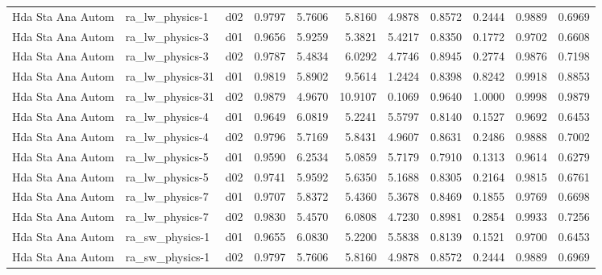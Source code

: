 \begin{longtable}{lllrrrrrrrr}
    Hda Sta Ana Autom  &       ra\_lw\_physics-1 &     d02 &   0.9797 &   5.7606 &   5.8160 &       4.9878 &        0.8572 &       0.2444 &           0.9889 &  0.6969 \\
    Hda Sta Ana Autom  &       ra\_lw\_physics-3 &     d01 &   0.9656 &   5.9259 &   5.3821 &       5.4217 &        0.8350 &       0.1772 &           0.9702 &  0.6608 \\
    Hda Sta Ana Autom  &       ra\_lw\_physics-3 &     d02 &   0.9787 &   5.4834 &   6.0292 &       4.7746 &        0.8945 &       0.2774 &           0.9876 &  0.7198 \\
    Hda Sta Ana Autom  &      ra\_lw\_physics-31 &     d01 &   0.9819 &   5.8902 &   9.5614 &       1.2424 &        0.8398 &       0.8242 &           0.9918 &  0.8853 \\
    Hda Sta Ana Autom  &      ra\_lw\_physics-31 &     d02 &   0.9879 &   4.9670 &  10.9107 &       0.1069 &        0.9640 &       1.0000 &           0.9998 &  0.9879 \\
    Hda Sta Ana Autom  &       ra\_lw\_physics-4 &     d01 &   0.9649 &   6.0819 &   5.2241 &       5.5797 &        0.8140 &       0.1527 &           0.9692 &  0.6453 \\
    Hda Sta Ana Autom  &       ra\_lw\_physics-4 &     d02 &   0.9796 &   5.7169 &   5.8431 &       4.9607 &        0.8631 &       0.2486 &           0.9888 &  0.7002 \\
    Hda Sta Ana Autom  &       ra\_lw\_physics-5 &     d01 &   0.9590 &   6.2534 &   5.0859 &       5.7179 &        0.7910 &       0.1313 &           0.9614 &  0.6279 \\
    Hda Sta Ana Autom  &       ra\_lw\_physics-5 &     d02 &   0.9741 &   5.9592 &   5.6350 &       5.1688 &        0.8305 &       0.2164 &           0.9815 &  0.6761 \\
    Hda Sta Ana Autom  &       ra\_lw\_physics-7 &     d01 &   0.9707 &   5.8372 &   5.4360 &       5.3678 &        0.8469 &       0.1855 &           0.9769 &  0.6698 \\
    Hda Sta Ana Autom  &       ra\_lw\_physics-7 &     d02 &   0.9830 &   5.4570 &   6.0808 &       4.7230 &        0.8981 &       0.2854 &           0.9933 &  0.7256 \\
    Hda Sta Ana Autom  &       ra\_sw\_physics-1 &     d01 &   0.9655 &   6.0830 &   5.2200 &       5.5838 &        0.8139 &       0.1521 &           0.9700 &  0.6453 \\
    Hda Sta Ana Autom  &       ra\_sw\_physics-1 &     d02 &   0.9797 &   5.7606 &   5.8160 &       4.9878 &        0.8572 &       0.2444 &           0.9889 &  0.6969 \\

\end{longtable}
